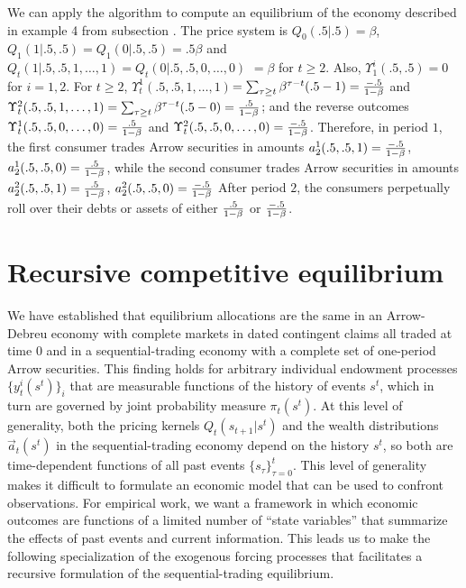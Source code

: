 \medskip


We can apply the algorithm to compute an equilibrium of the economy described in  example 4 from subsection . 
The price system is $Q_0(.5\big|.5) =\beta$, 
$Q_1(1\big|.5,.5) = Q_1(0\big|.5,.5) = .5 \beta$  and
$Q_t(1\big|.5,.5,1,\ldots,1) = Q_t(0\big|.5,.5,0,\ldots,0)$ 
$= \beta $ for $t \geq 2$.
Also, $\Upsilon^i_1(.5,.5)= 0$ for $i=1,2$.  For $t \geq 2$,
$\Upsilon_t^1 (.5,.5,1, \ldots,1)$$= \sum_{\tau \geq t} \beta^{\tau - t}(.5 -1) = {-.5 \over 1-\beta}$ and
$\Upsilon_t^2(.5,.5,1, \ldots,1) = \sum_{\tau \geq t} \beta^{\tau - t}(.5 -0) = {.5 \over 1-\beta}$; and
the reverse outcomes  
$\Upsilon_t^1 (.5,.5,0, \ldots,0)= {.5 \over 1-\beta}$ and
$\Upsilon_t^2 (.5,.5,0, \ldots,0)= {-.5 \over 1-\beta}$.
Therefore, in period $1$, the first  consumer trades Arrow securities in amounts $a_2^1(.5,.5,1) = {-.5 \over 1-\beta}$,
$a_2^1(.5,.5,0) = {.5 \over 1-\beta}$, while the second consumer trades  Arrow securities in amounts 
$a_2^2(.5,.5,1) = {.5 \over 1-\beta}$,
$a_2^2(.5,.5,0) = {-.5 \over 1-\beta}$   After period $2$, the consumers perpetually roll over their debts or assets of either
${.5 \over 1-\beta}$ or ${-.5 \over 1 - \beta}$.






\section{Recursive competitive equilibrium}\label{sec:Markovs}%
We have established that  equilibrium allocations are the same
in an Arrow-Debreu economy with  complete markets in dated
contingent claims all traded at time 0 and in a sequential-trading
economy with a complete set of one-period Arrow securities. This finding
holds for arbitrary individual endowment processes
$\{y^i_t(s^t)\}_i$ that are measurable functions of the history of
events $s^t$, which in turn are governed by joint
probability measure $\pi_t(s^t)$. At this level of generality, both 
 the pricing kernels $Q_t(s_{t+1} | s^t)$ and the
wealth distributions $\vec {a}_t(s^t)$ in the
sequential-trading economy  depend on the history $s^t$, so both
 are time-dependent functions of all past events
$\{s_\tau\}_{\tau=0}^t$. This level of generality  makes it  difficult to
formulate an economic model that can be used to confront
observations. For empirical work, we want  a framework in which economic outcomes
are functions of a limited number of ``state variables'' that
summarize the effects of past events and current information. This
 leads us to make the following specialization of the
exogenous forcing processes that facilitates a recursive formulation
of the sequential-trading equilibrium.



